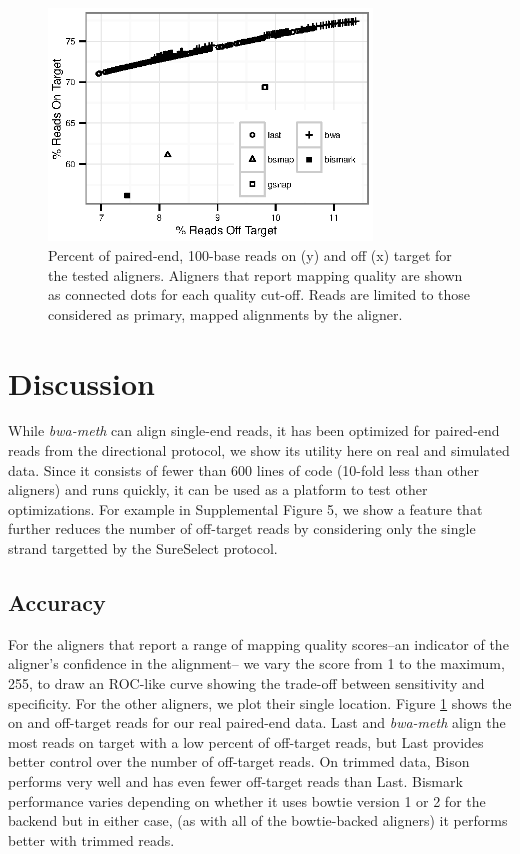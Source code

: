 \documentclass{bioinfo}
\begin{document}
\begin{figure}[!tpb]%
    \centerline{\includegraphics[width=86mm]{qual-plot-real}}
    \caption{Percent of paired-end, 100-base reads on (y) and off (x) target for the tested aligners. Aligners that report mapping quality are shown as connected dots for each quality cut-off. Reads are limited to those considered as primary, mapped alignments by the aligner.}\label{fig:01}
\end{figure}

\section{Discussion}

While \textit{bwa-meth} can align single-end reads, it has been optimized for
paired-end reads from the directional protocol, we show its utility here on real
and simulated data. Since it consists
of fewer than 600 lines of code (10-fold less than other aligners) and runs
quickly, it can be used as a platform to test other optimizations. For example
in Supplemental Figure 5, we show a feature that further reduces the
number of off-target reads by considering only the single strand targetted by
the SureSelect protocol.

\subsection{Accuracy}
For the aligners that report a range of mapping quality
scores--an indicator of the aligner's confidence in the alignment--
we vary the score from 1 to the maximum, 255, to draw an ROC-like
curve showing the trade-off between sensitivity and specificity. For the
other aligners, we plot their single location. Figure \ref{fig:01} shows
the on and off-target reads for our real paired-end data. Last and 
\textit{bwa-meth} align the most reads on target with a low percent
of off-target reads, but Last provides better control over the number
of off-target reads. On trimmed data, Bison performs very well and has
even fewer off-target reads than Last.
Bismark performance varies depending on whether it uses bowtie version
1 or 2 for the backend but in either case, (as with all of the bowtie-backed
aligners) it performs better with trimmed reads.
\end{document}
